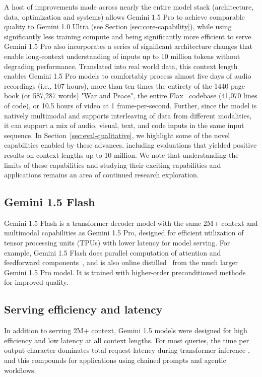 A host of improvements made across nearly the entire model stack (architecture, data, optimization and systems) allows Gemini 1.5 Pro to achieve comparable quality to Gemini 1.0 Ultra (see Section \ref{sec:core-capability}), while using significantly less training compute and being significantly more efficient to serve. Gemini 1.5 Pro also incorporates a series of significant architecture changes that enable long-context understanding of inputs up to 10 million tokens without degrading performance. Translated into real world data, this context length enables Gemini 1.5 Pro models to comfortably process almost five days of audio recordings (i.e., 107 hours), more than ten times the entirety of the 1440 page book (or 587,287 words) "War and Peace", the entire Flax~\citep{flax2020github} codebase (41,070 lines of code), or 10.5 hours of video at 1 frame-per-second. Further, since the model is natively multimodal and supports interleaving of data from different modalities, it can support a mix of audio, visual, text, and code inputs in the same input sequence. In Section~\ref{sec:eval-qualitative}, we highlight some of the novel capabilities enabled by these advances, including evaluations that yielded positive results on context lengths up to 10 million. We note that understanding the limits of these capabilities and studying their exciting capabilities and applications remains an area of continued research exploration.

\subsection{Gemini 1.5 Flash} Gemini 1.5 Flash is a transformer decoder model with the same 2M+ context and multimodal capabilities as Gemini 1.5 Pro, designed for efficient utilization of tensor processing units (TPUs) with lower latency for model serving. For example, Gemini 1.5 Flash does parallel computation of attention and feedforward components~\citep{palm}, and is also online distilled~\citep{Bucila2006ModelC, hinton2015distilling, anil2018large, beyer2021knowledge, agarwal2024policy} from the much larger Gemini 1.5 Pro model. It is trained with higher-order preconditioned methods~\citep{beckerlecun1989, heskes2000, duchi2011} for improved quality.

\subsection{Serving efficiency and latency}

In addition to serving 2M+ context, Gemini 1.5 models were designed for high efficiency and low latency at all context lengths. For most queries, the time per output character dominates total request latency during transformer inference \cite{pope2023efficiently}, and this compounds for applications using chained prompts and agentic workflows.

